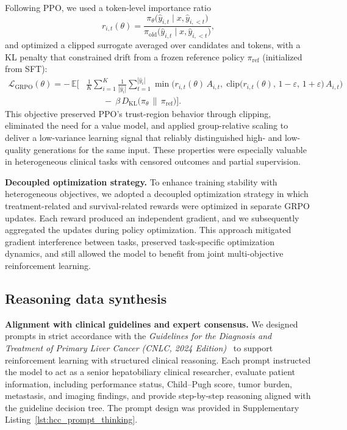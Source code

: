 \documentclass{article}
\begin{document}
Following PPO, we used a token-level importance ratio
\begin{equation}
r_{i,t}(\theta)=
\frac{\pi_{\theta}\!\big(\hat y_{i,t}\mid x,\hat y_{i,<t}\big)}
     {\pi_{\text{old}}\!\big(\hat y_{i,t}\mid x,\hat y_{i,<t}\big)},
\label{eq:grpo-imp}
\end{equation}
and optimized a clipped surrogate averaged over candidates and tokens, with a KL penalty that constrained drift from a frozen reference policy $\pi_{\mathrm{ref}}$ (initialized from SFT):
\begin{equation}
\begin{aligned}
\mathcal{L}_{\text{GRPO}}(\theta)
= -\,\mathbb{E}\Bigg[
&\frac{1}{K}\sum_{i=1}^{K}\frac{1}{|\hat y_i|}\sum_{t=1}^{|\hat y_i|}
\min\!\Big(
r_{i,t}(\theta)\,A_{i,t},\;
\mathrm{clip}\big(r_{i,t}(\theta),\,1-\varepsilon,\,1+\varepsilon\big)\,A_{i,t}
\Big) \\
&\qquad -\ \beta\,D_{\mathrm{KL}}\!\big(\pi_{\theta}\,\|\,\pi_{\mathrm{ref}}\big)
\Bigg].
\end{aligned}
\label{eq:grpo-loss}
\end{equation}
This objective preserved PPO’s trust-region behavior through clipping, eliminated the need for a value model, and applied group-relative scaling to deliver a low-variance learning signal that reliably distinguished high- and low-quality generations for the same input. These properties were especially valuable in heterogeneous clinical tasks with censored outcomes and partial supervision.

\textbf{Decoupled optimization strategy.} 
To enhance training stability with heterogeneous objectives, we adopted a decoupled optimization strategy in which treatment-related and survival-related rewards were optimized in separate GRPO updates. Each reward produced an independent gradient, and we subsequently aggregated the updates during policy optimization. This approach mitigated gradient interference between tasks, preserved task-specific optimization dynamics, and still allowed the model to benefit from joint multi-objective reinforcement learning.


\subsection{Reasoning data synthesis}
\textbf{Alignment with clinical guidelines and expert consensus.}
We designed prompts in strict accordance with the \emph{Guidelines for the Diagnosis and Treatment of Primary Liver Cancer (CNLC, 2024 Edition)}~\cite{jia2024chinese} to support reinforcement learning with structured clinical reasoning. Each prompt instructed the model to act as a senior hepatobiliary clinical researcher, evaluate patient information, including performance status, Child--Pugh score, tumor burden, metastasis, and imaging findings, and provide step-by-step reasoning aligned with the guideline decision tree. The prompt design was provided in {Supplementary Listing~\ref{lst:hcc_prompt_thinking}}.  
\end{document}
